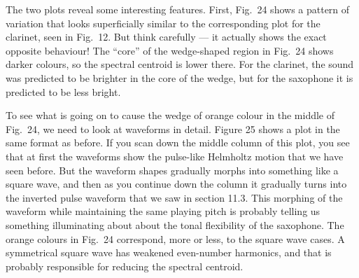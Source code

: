 
  The two plots reveal some interesting features. First, Fig.\ 24 shows a 
  pattern of variation that looks superficially similar to the corresponding 
  plot for the clarinet, seen in Fig.\ 12. But think carefully — it actually 
  shows the exact opposite behaviour! The “core” of the wedge-shaped region in 
  Fig.\ 24 shows darker colours, so the spectral centroid is lower there. For 
  the clarinet, the sound was predicted to be brighter in the core of the 
  wedge, but for the saxophone it is predicted to be less bright. 

  To see what is going on to cause the wedge of orange colour in the middle of 
  Fig.\ 24, we need to look at waveforms in detail. Figure 25 shows a plot in 
  the same format as before. If you scan down the middle column of this plot, 
  you see that at first the waveforms show the pulse-like Helmholtz motion that 
  we have seen before. But the waveform shapes gradually morphs into something 
  like a square wave, and then as you continue down the column it gradually 
  turns into the inverted pulse waveform that we saw in section 11.3. This 
  morphing of the waveform while maintaining the same playing pitch is probably 
  telling us something illuminating about about the tonal flexibility of the 
  saxophone. The orange colours in Fig.\ 24 correspond, more or less, to the 
  square wave cases. A symmetrical square wave has weakened even-number 
  harmonics, and that is probably responsible for reducing the spectral 
  centroid. 


